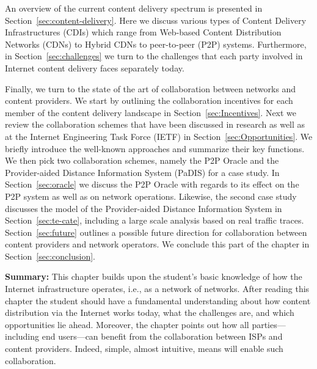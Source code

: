 An overview of the current content delivery spectrum is presented in
Section~\ref{sec:content-delivery}. Here we discuss various types of Content
Delivery Infrastructures (CDIs) which range from Web-based Content Distribution
Networks (CDNs) to Hybrid CDNs to peer-to-peer (P2P) systems. Furthermore, in
Section~\ref{sec:challenges} we turn to the challenges that each party involved
in Internet content delivery faces separately today.

Finally, we turn to the state of the art of collaboration between networks and
content providers.  We start by outlining the collaboration incentives for each
member of the content delivery landscape in Section~\ref{sec:Incentives}. Next
we review the collaboration schemes that have been discussed in research as
well as at the Internet Engineering Task Force (IETF) in
Section~\ref{sec:Opportunities}. We briefly introduce the well-known approaches
and summarize their key functions. We then pick two collaboration schemes,
namely the P2P Oracle and the Provider-aided Distance Information System
(PaDIS) for a case study. In Section~\ref{sec:oracle} we discuss the P2P Oracle
with regards to its effect on the P2P system as well as on network operations.
Likewise, the second case study discusses the model of the Provider-aided
Distance Information System in Section~\ref{sec:te-cate}, including a large
scale analysis based on real traffic traces.  Section~\ref{sec:future} outlines
a possible future direction for collaboration between content providers and
network operators.  We conclude this part of the chapter in
Section~\ref{sec:conclusion}.


\bigskip 

\noindent\textbf{Summary:} This chapter builds upon the student's
basic knowledge of how the Internet infrastructure operates, i.e., as a network
of networks. After reading this chapter the student should have a fundamental
understanding about how content distribution via the Internet works today, what
the challenges are, and which opportunities lie ahead. Moreover, the chapter
points out how all parties---including end users---can benefit from the
collaboration between ISPs and content providers. Indeed, simple, almost
intuitive, means will enable such collaboration.
